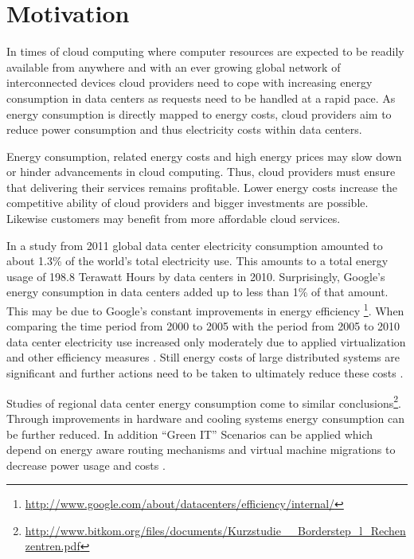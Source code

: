 

\section{Motivation}

In times of cloud computing where computer resources are expected to be readily available from anywhere \cite{buyya2009cloud} and with an ever growing global network of interconnected devices cloud providers need to cope with increasing energy consumption in data centers as requests need to be handled at a rapid pace. 
As energy consumption is directly mapped to energy costs, cloud providers aim to reduce power consumption and thus electricity costs within data centers. 

Energy consumption, related energy costs and high energy prices may slow down or hinder advancements in cloud computing. Thus, cloud providers must ensure that delivering their services remains profitable. Lower energy costs increase the competitive ability of cloud providers and bigger investments are possible. Likewise customers may benefit from more affordable cloud services. 

In a study from 2011 \cite{koomey2011growth} global data center electricity consumption amounted to about 1.3\% of the world's total electricity use. This amounts to a total energy usage of 198.8 Terawatt Hours by data centers in 2010. Surprisingly, Google's energy consumption in data centers added up to less than 1\% of that amount. This may be due to Google's constant improvements in energy efficiency \footnote{\url{http://www.google.com/about/datacenters/efficiency/internal/}}. When comparing the time period from 2000 to 2005 with the period from 2005 to 2010 data center electricity use increased only moderately due to applied virtualization and other efficiency measures \cite{koomey2011growth, koomey2008worldwide}. Still energy costs of large distributed systems are significant and further actions need to be taken to ultimately reduce these costs \cite{qureshi2009cutting}. 

Studies of regional data center energy consumption come to similar conclusions\footnote{\url{http://www.bitkom.org/files/documents/Kurzstudie__Borderstep_l_Rechenzentren.pdf}}. Through improvements in hardware and cooling systems energy consumption can be further reduced. In addition "`Green IT"' Scenarios can be applied which depend on energy aware routing mechanisms and virtual machine migrations to decrease power usage and costs \cite{liu2009greencloud}. 

